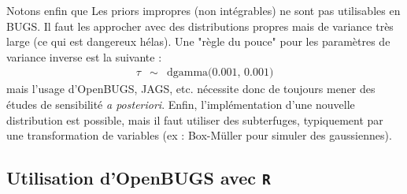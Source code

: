 Notons enfin que Les priors impropres (non intégrables) ne sont pas utilisables en BUGS. Il faut les approcher avec des distributions propres mais de variance très large (ce qui est dangereux hélas). Une "règle du pouce" pour les paramètres de variance inverse est la suivante : 
 \begin{eqnarray*}
\tau &  \sim & \text{dgamma(0.001, 0.001)}
 \end{eqnarray*} 
 mais l'usage d'OpenBUGS, JAGS, etc. nécessite donc de toujours mener des études de sensibilité {\it a posteriori}. Enfin, l'implémentation d'une nouvelle distribution est possible, mais il faut utiliser des subterfuges, typiquement par une transformation de variables (ex : Box-M\"uller pour simuler des gaussiennes).

\subsection{Utilisation d'OpenBUGS avec \texttt{R}}

